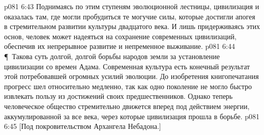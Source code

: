 \vs p081 6:43 Поднимаясь по этим ступеням эволюционной лестницы, цивилизация и оказалась там, где могли пробудиться те могучие силы, которые достигли апогея в стремительном развитии культуры двадцатого века. И лишь придерживаясь этих основ, человек может надеяться на сохранение современных цивилизаций, обеспечив их непрерывное развитие и непременное выживание.
\vs p081 6:44 \P\ Такова суть долгой, долгой борьбы народов земли за установление цивилизации со времен Адама. Современная культура есть конечный результат этой потребовавшей огромных усилий эволюции. До изобретения книгопечатания прогресс шел относительно медленно, так как одно поколение не могло быстро извлекать пользу из достижений своих предшественников. Однако теперь человеческое общество стремительно движется вперед под действием энергии, аккумулированной за все века, через которые цивилизация прошла в борьбе.
\vs p081 6:45 [Под покровительством Архангела Небадона.]
